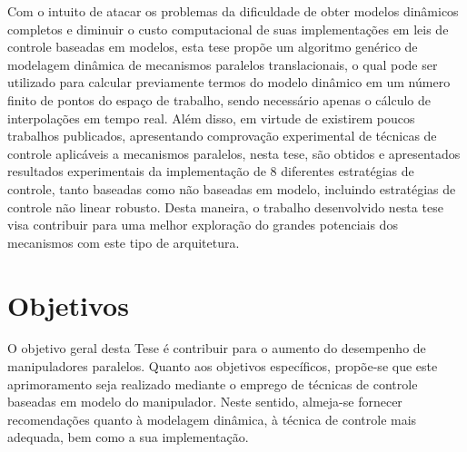 \documentclass[]{politex}
\begin{document}
Com o intuito de atacar os problemas da dificuldade de obter modelos dinâmicos completos e diminuir o custo computacional de suas implementações em leis de controle baseadas em modelos, esta tese propõe um algoritmo genérico de modelagem dinâmica de mecanismos paralelos translacionais, o qual pode ser utilizado para calcular previamente termos do modelo dinâmico em um número finito de pontos do espaço de trabalho, sendo necessário apenas o cálculo de interpolações em tempo real.  Além disso, em virtude de existirem poucos  trabalhos publicados, apresentando comprovação experimental de técnicas de controle aplicáveis a mecanismos paralelos, nesta tese, são obtidos e apresentados resultados experimentais da implementação de 8 diferentes estratégias de controle, tanto baseadas como não baseadas em modelo, incluindo estratégias de controle não linear robusto. Desta maneira, o trabalho desenvolvido nesta tese visa contribuir para uma melhor exploração do grandes potenciais dos mecanismos com este tipo de arquitetura.


    

\section{Objetivos}\label{objetivos}

O objetivo geral desta Tese é contribuir para o aumento do desempenho de manipuladores paralelos. Quanto aos objetivos específicos, propõe-se que este aprimoramento seja realizado mediante o emprego de técnicas de controle baseadas em modelo do manipulador. Neste sentido, almeja-se fornecer recomendações quanto à modelagem dinâmica, à técnica de controle mais adequada, bem como a sua implementação.
\end{document}
